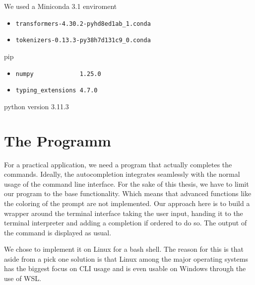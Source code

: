 
We used a Miniconda 3.1 enviroment

\begin{itemize}
\item \begin{verbatim}
transformers-4.30.2-pyhd8ed1ab_1.conda
\end{verbatim}

\item \begin{verbatim}
tokenizers-0.13.3-py38h7d131c9_0.conda
\end{verbatim}
  
\end{itemize}

pip
\begin{itemize}
\item \begin{verbatim}
numpy             1.25.0
\end{verbatim}

\item \begin{verbatim}
typing_extensions 4.7.0
\end{verbatim}
  
\end{itemize}


python version  3.11.3



\section{The Programm}
For a practical application, we need a program that actually completes the commands.
Ideally, the autocompletion integrates seamlessly with the normal usage of the command line interface. For the sake of this thesis, we have to limit our program to the base functionality. Which means that advanced functions like the coloring of the prompt are not implemented. Our approach here is to build a wrapper around the terminal interface taking the user input, handing it to the terminal interpreter and adding a completion if ordered to do so. The output of the command is displayed as usual.


We chose to implement it on Linux for a bash shell. The reason for this is that aside from a pick one solution is that Linux among the major operating systems has the biggest focus on CLI usage and is even usable on Windows through the use of WSL.
 

